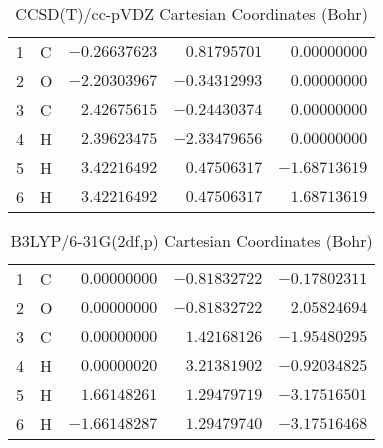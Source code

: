 \documentclass[10pt,oneside]{article}
\begin{document}
\begin{table}[h!]
\centering
\caption{CCSD(T)/cc-pVDZ Cartesian Coordinates (Bohr)}
\begin{tabular}{llrrr}
1  & C  & $-0.26637623$ & $ 0.81795701$ & $ 0.00000000$ \\
2  & O  & $-2.20303967$ & $-0.34312993$ & $ 0.00000000$ \\
3  & C  & $ 2.42675615$ & $-0.24430374$ & $ 0.00000000$ \\
4  & H  & $ 2.39623475$ & $-2.33479656$ & $ 0.00000000$ \\
5  & H  & $ 3.42216492$ & $ 0.47506317$ & $-1.68713619$ \\
6  & H  & $ 3.42216492$ & $ 0.47506317$ & $ 1.68713619$ \\
\end{tabular}
\end{table}

\begin{table}[h!]
\centering
\caption{B3LYP/6-31G(2df,p) Cartesian Coordinates (Bohr)}
\begin{tabular}{llrrr}
1  & C  & $ 0.00000000$ & $-0.81832722$ & $-0.17802311$ \\
2  & O  & $ 0.00000000$ & $-0.81832722$ & $ 2.05824694$ \\
3  & C  & $ 0.00000000$ & $ 1.42168126$ & $-1.95480295$ \\
4  & H  & $ 0.00000020$ & $ 3.21381902$ & $-0.92034825$ \\
5  & H  & $ 1.66148261$ & $ 1.29479719$ & $-3.17516501$ \\
6  & H  & $-1.66148287$ & $ 1.29479740$ & $-3.17516468$ \\
\end{tabular}
\end{table}

\clearpage
\end{document}
